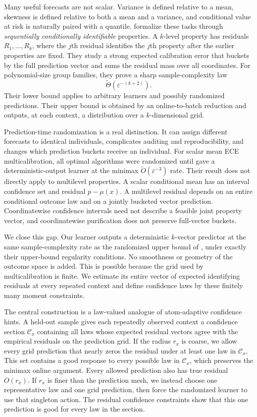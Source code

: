 \documentclass{article}
\theoremstyle{definition}
\theoremstyle{remark}
\newcommand{\1}{\mathbf 1}
\newcommand{\cC}{\mathcal C}
\begin{document}
Many useful forecasts are not scalar. Variance is defined relative to a mean, skewness is defined relative to both a mean and a variance, and conditional value at risk is naturally paired with a quantile. \citet{lu2026multilevel} formalize these tasks through \emph{sequentially conditionally identifiable} properties. A $k$-level property has residuals $R_1,\ldots,R_k$, where the $j$th residual identifies the $j$th property after the earlier properties are fixed. They study a strong expected calibration error that buckets by the full prediction vector and sums the residual mass over all coordinates. For polynomial-size group families, they prove a sharp sample-complexity law \[ \widetilde\Theta(\varepsilon^{-(k+2)}). \] Their lower bound applies to arbitrary learners and possibly randomized predictions. Their upper bound is obtained by an online-to-batch reduction and outputs, at each context, a distribution over a $k$-dimensional grid.

Prediction-time randomization is a real distinction. It can assign different forecasts to identical individuals, complicates auditing and reproducibility, and changes which prediction buckets receive an individual. For scalar mean ECE multicalibration, all optimal algorithms were randomized until \citet{noarovroth2026deterministic} gave a deterministic-output learner at the minimax $\widetilde O(\varepsilon^{-3})$ rate. Their result does not directly apply to multilevel properties. A scalar conditional mean has an interval confidence set and residual $p-\mu(x)$. A multilevel residual depends on an entire conditional outcome law and on a jointly bucketed vector prediction. Coordinatewise confidence intervals need not describe a feasible joint property vector, and coordinatewise purification does not preserve full-vector buckets.

We close this gap. Our learner outputs a deterministic $k$-vector predictor at the same sample-complexity rate as the randomized upper bound of \citet{lu2026multilevel}, under exactly their upper-bound regularity conditions. No smoothness or geometry of the outcome space is added. This is possible because the grid used by multicalibration is finite. We estimate its entire vector of expected identifying residuals at every repeated context and define confidence laws by these finitely many moment constraints.

The central construction is a law-valued analogue of atom-adaptive confidence hints. A held-out sample gives each repeatedly observed context a confidence section $\cC_x$ containing all laws whose expected residual vectors agree with the empirical residuals on the prediction grid. If the radius $r_x$ is coarse, we allow every grid prediction that nearly zeros the residual under at least one law in $\cC_x$. This set contains a good response to every possible law in $\cC_x$, which preserves the minimax online argument. Every allowed prediction also has true residual $O(r_x)$. If $r_x$ is finer than the prediction mesh, we instead choose one representative law and one grid prediction, then force the randomized learner to use that singleton action. The residual confidence constraints show that this one prediction is good for every law in the section.
\end{document}

